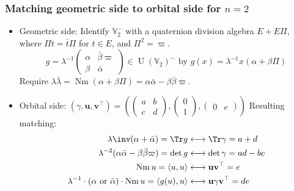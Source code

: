 \documentclass[11pt]{beamer}
\DeclareMathOperator{\Nm}{Nm}
\DeclareMathOperator{\U}{U}
\newcommand{\VV}{\mathbb{V}}
\newcommand{\guv}{{(\gamma, \uu, \vv^\top)}}
\newcommand{\uu}{\mathbf{u}}
\newcommand{\vv}{\mathbf{v}}
\begin{document}
\begin{frame}
  \frametitle{Matching geometric side to orbital side for $n=2$}
  \begin{itemize}
    \item \alert{Geometric side}:
    Identify $\VV_2^-$ with a quaternion division algebra $E + E \Pi$,
    where $\Pi t = \bar t \Pi$ for $t \in E$, and $\Pi^2 = \varpi$.
    \[
      g = \lambda^{-1} \begin{pmatrix} \alpha & \bar\beta\varpi \\ \beta & \bar\alpha \end{pmatrix} \in \U(\VV_2)^-
      \text{ by } g(x)= \lambda^{-1} x (\alpha + \beta \Pi)
    \]
    Require $\lambda \bar\lambda = \Nm(\alpha + \beta \Pi) = \alpha \bar \alpha - \beta \bar \beta \varpi$.
    \item \alert{Orbital side}:
    $\guv = \left( \begin{pmatrix} a & b \\ c & d \end{pmatrix},
      \begin{pmatrix} 0 \\ 1 \end{pmatrix},
      \begin{pmatrix} 0 & e \end{pmatrix} \right)$
      \ii Resulting \alert{matching}:
    \begin{align*}
      \lambda\inv(\alpha + \bar\alpha) =\Tr g &\longleftrightarrow \Tr \gamma = a + d \\
      \lambda^{-2}(\alpha \bar \alpha - \beta \bar\beta \varpi ) = \det g &\longleftrightarrow \det \gamma = ad - bc \\
      \Nm u = \left\langle u,u \right\rangle &\longleftrightarrow \uu \vv^\top = e \\
      \lambda^{-1} \cdot (\alpha \text{ or } \bar\alpha) \cdot \Nm u = \left\langle g(u), u \right\rangle
        &\longleftrightarrow \uu \gamma \vv^\top = d e \\
    \end{align*}
  \end{itemize}
\end{frame}
\end{document}
